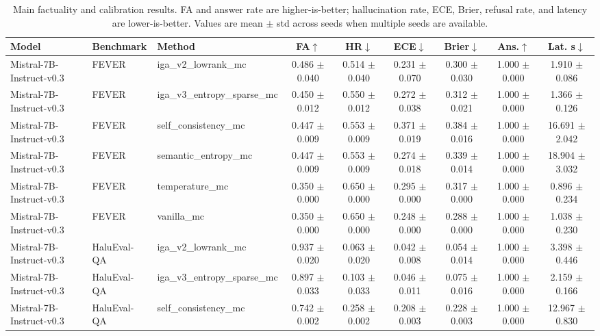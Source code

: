 \begin{table}[t]
\centering
\caption{Main factuality and calibration results. FA and answer rate are higher-is-better; hallucination rate, ECE, Brier, refusal rate, and latency are lower-is-better. Values are mean $\pm$ std across seeds when multiple seeds are available.}
\label{tab:main_results}
\small
\begin{tabular}{lllcccccc}
\toprule
Model & Benchmark & Method & FA$\uparrow$ & HR$\downarrow$ & ECE$\downarrow$ & Brier$\downarrow$ & Ans.$\uparrow$ & Lat. s$\downarrow$ \\
\midrule
Mistral-7B-Instruct-v0.3 & FEVER & iga\_v2\_lowrank\_mc & 0.486 $\pm$ 0.040 & 0.514 $\pm$ 0.040 & 0.231 $\pm$ 0.070 & 0.300 $\pm$ 0.030 & 1.000 $\pm$ 0.000 & 1.910 $\pm$ 0.086 \\
Mistral-7B-Instruct-v0.3 & FEVER & iga\_v3\_entropy\_sparse\_mc & 0.450 $\pm$ 0.012 & 0.550 $\pm$ 0.012 & 0.272 $\pm$ 0.038 & 0.312 $\pm$ 0.021 & 1.000 $\pm$ 0.000 & 1.366 $\pm$ 0.126 \\
Mistral-7B-Instruct-v0.3 & FEVER & self\_consistency\_mc & 0.447 $\pm$ 0.009 & 0.553 $\pm$ 0.009 & 0.371 $\pm$ 0.019 & 0.384 $\pm$ 0.016 & 1.000 $\pm$ 0.000 & 16.691 $\pm$ 2.042 \\
Mistral-7B-Instruct-v0.3 & FEVER & semantic\_entropy\_mc & 0.447 $\pm$ 0.009 & 0.553 $\pm$ 0.009 & 0.274 $\pm$ 0.018 & 0.339 $\pm$ 0.014 & 1.000 $\pm$ 0.000 & 18.904 $\pm$ 3.032 \\
Mistral-7B-Instruct-v0.3 & FEVER & temperature\_mc & 0.350 $\pm$ 0.000 & 0.650 $\pm$ 0.000 & 0.295 $\pm$ 0.000 & 0.317 $\pm$ 0.000 & 1.000 $\pm$ 0.000 & 0.896 $\pm$ 0.234 \\
Mistral-7B-Instruct-v0.3 & FEVER & vanilla\_mc & 0.350 $\pm$ 0.000 & 0.650 $\pm$ 0.000 & 0.248 $\pm$ 0.000 & 0.288 $\pm$ 0.000 & 1.000 $\pm$ 0.000 & 1.038 $\pm$ 0.230 \\
Mistral-7B-Instruct-v0.3 & HaluEval-QA & iga\_v2\_lowrank\_mc & 0.937 $\pm$ 0.020 & 0.063 $\pm$ 0.020 & 0.042 $\pm$ 0.008 & 0.054 $\pm$ 0.014 & 1.000 $\pm$ 0.000 & 3.398 $\pm$ 0.446 \\
Mistral-7B-Instruct-v0.3 & HaluEval-QA & iga\_v3\_entropy\_sparse\_mc & 0.897 $\pm$ 0.033 & 0.103 $\pm$ 0.033 & 0.046 $\pm$ 0.011 & 0.075 $\pm$ 0.016 & 1.000 $\pm$ 0.000 & 2.159 $\pm$ 0.166 \\
Mistral-7B-Instruct-v0.3 & HaluEval-QA & self\_consistency\_mc & 0.742 $\pm$ 0.002 & 0.258 $\pm$ 0.002 & 0.208 $\pm$ 0.003 & 0.228 $\pm$ 0.003 & 1.000 $\pm$ 0.000 & 12.967 $\pm$ 0.830 \\

\end{tabular}
\end{table}
